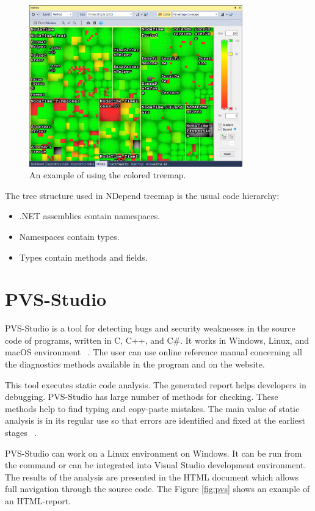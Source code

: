 \begin{figure}[ht]
	\centering
	\includegraphics[height=70mm]{figures/tree.png}
	\caption{An example of using the colored treemap.}
	\label{fig:tree}
\end{figure}

The tree structure used in NDepend treemap is the usual code hierarchy: 

\begin{itemize}
	\item .NET assemblies contain namespaces.
	\item Namespaces contain types.
	\item Types contain methods and fields.
\end{itemize}

\section{PVS-Studio}

PVS-Studio is a tool for detecting bugs and security weaknesses in the source code of programs, written in C, C++, and C\#. It works in Windows, Linux, and macOS environment ~\cite{pvs}. The user can use online reference manual concerning all the diagnostics methods available in the program and  on the website.

This tool executes static code analysis. The generated report helps developers in debugging. PVS-Studio has large number of methods for checking. These methods help to find typing and copy-paste mistakes. The main value of static analysis is in its regular use so that errors are identified and fixed at the earliest stages ~\cite{pvs}. 				

PVS-Studio can work on a Linux environment on Windows. It can be run from the command or can be integrated into Visual Studio development environment. The results of the analysis are presented in the HTML document which allows full navigation through the source code. The Figure \ref{fig:pvs} shows an example of an HTML-report.

